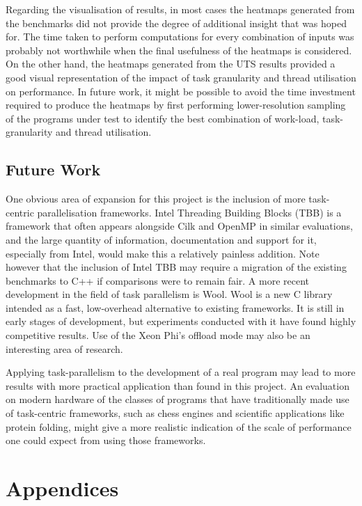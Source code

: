 \documentclass{report}
\begin{document}
Regarding the visualisation of results, in most cases the heatmaps generated from the benchmarks did not provide the degree of additional insight that was hoped for. The time taken to perform computations for every combination of inputs was probably not worthwhile when the final usefulness of the heatmaps is considered. On the other hand, the heatmaps generated from the UTS results provided a good visual representation of the impact of task granularity and thread utilisation on performance. In future work, it might be possible to avoid the time investment required to produce the heatmaps by first performing lower-resolution sampling of the programs under test to identify the best combination of work-load, task-granularity and thread utilisation.

\section{Future Work}

One obvious area of expansion for this project is the inclusion of more task-centric parallelisation frameworks. Intel Threading Building Blocks (TBB) is a framework that often appears alongside Cilk and OpenMP in similar evaluations, and the large quantity of information, documentation and support for it, especially from Intel, would make this a relatively painless addition. Note however that the inclusion of Intel TBB may require a migration of the existing benchmarks to C++ if comparisons were to remain fair. A more recent development in the field of task parallelism is Wool\cite{woolsite}. Wool is a new C library intended as a fast, low-overhead alternative to existing frameworks. It is still in early stages of development, but experiments conducted with it have found highly competitive results\cite{Podobas15}. Use of the Xeon Phi's offload mode may also be an interesting area of research.

Applying task-parallelism to the development of a real program may lead to more results with more practical application than found in this project. An evaluation on modern hardware of the classes of programs that have traditionally made use of task-centric frameworks, such as chess engines and scientific applications like protein folding\cite{Dailey01}, might give a more realistic indication of the scale of performance one could expect from using those frameworks. 




\chapter{Appendices} \label{Sec:appendices}
\end{document}
